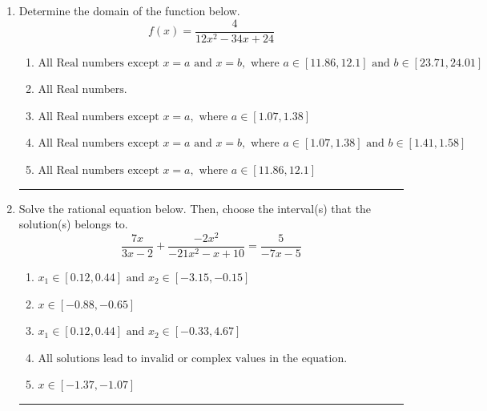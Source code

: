 \documentclass[14pt]{extbook}
\newcommand{\litem}[1]{\item#1\hspace*{-1cm}\rule{\textwidth}{0.4pt}}
\begin{document}
\begin{enumerate}
\litem{
Determine the domain of the function below.\[ f(x) = \frac{4}{12x^{2} -34 x + 24} \]\begin{enumerate}[label=\Alph*.]
\item \( \text{All Real numbers except } x = a \text{ and } x = b, \text{ where } a \in [11.86, 12.1] \text{ and } b \in [23.71, 24.01] \)
\item \( \text{All Real numbers.} \)
\item \( \text{All Real numbers except } x = a, \text{ where } a \in [1.07, 1.38] \)
\item \( \text{All Real numbers except } x = a \text{ and } x = b, \text{ where } a \in [1.07, 1.38] \text{ and } b \in [1.41, 1.58] \)
\item \( \text{All Real numbers except } x = a, \text{ where } a \in [11.86, 12.1] \)

\end{enumerate} }
\litem{
Solve the rational equation below. Then, choose the interval(s) that the solution(s) belongs to.\[ \frac{7x}{3x -2} + \frac{-2x^{2}}{-21x^{2} -x + 10} = \frac{5}{-7x -5} \]\begin{enumerate}[label=\Alph*.]
\item \( x_1 \in [0.12, 0.44] \text{ and } x_2 \in [-3.15,-0.15] \)
\item \( x \in [-0.88,-0.65] \)
\item \( x_1 \in [0.12, 0.44] \text{ and } x_2 \in [-0.33,4.67] \)
\item \( \text{All solutions lead to invalid or complex values in the equation.} \)
\item \( x \in [-1.37,-1.07] \)


\end{enumerate}}
\end{enumerate}
\end{document}
